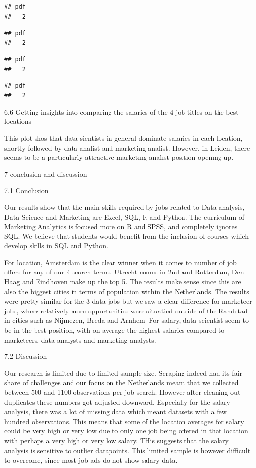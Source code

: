 \documentclass[
]{article}
\begin{document}
\begin{verbatim}
## pdf 
##   2
\end{verbatim}

\begin{verbatim}
## pdf 
##   2
\end{verbatim}

\begin{verbatim}
## pdf 
##   2
\end{verbatim}

\begin{verbatim}
## pdf 
##   2
\end{verbatim}

6.6 Getting insights into comparing the salaries of the 4 job titles on
the best locations

This plot shos that data sientists in general dominate salaries in each
location, shortly followed by data analist and marketing analist.
However, in Leiden, there seems to be a particularly attractive
marketing analist position opening up.

7 conclusion and discussion

7.1 Conclusion

Our results show that the main skills required by jobs related to Data
analysis, Data Science and Marketing are Excel, SQL, R and Python. The
curriculum of Marketing Analytics is focused more on R and SPSS, and
completely ignores SQL. We believe that students would benefit from the
inclusion of courses which develop skills in SQL and Python.

For location, Amsterdam is the clear winner when it comes to number of
job offers for any of our 4 search terms. Utrecht comes in 2nd and
Rotterdam, Den Haag and Eindhoven make up the top 5. The results make
sense since this are also the biggest cities in terms of population
within the Netherlands. The results were pretty similar for the 3 data
jobs but we saw a clear difference for marketeer jobs, where relatively
more opportunities were situatied outside of the Randstad in cities such
as Nijmegen, Breda and Arnhem. For salary, data scientist seem to be in
the best position, with on average the highest salaries compared to
marketeers, data analysts and marketing analysts.

7.2 Discussion

Our research is limited due to limited sample size. Scraping indeed had
its fair share of challenges and our focus on the Netherlands meant that
we collected between 500 and 1100 observations per job search. However
after cleaning out duplicates these numbers got adjusted downward.
Especially for the salary analysis, there was a lot of missing data
which meant datasets with a few hundred observations. This means that
some of the location averages for salary could be very high or very low
due to only one job being offered in that location with perhaps a very
high or very low salary. THis suggests that the salary analysis is
sensitive to outlier datapoints. This limited sample is however
difficult to overcome, since most job ads do not show salary data.
\end{document}
